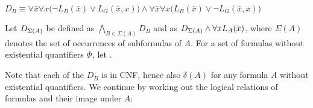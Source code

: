 \begin{defi}
\begin{itemize}
		$D_B\equiv \forall \bar x \forall x \big(\lnot L_B(\bar x) \lor L_G(\bar x, x)\big) \land \forall \bar x \forall x \big(L_B(\bar x) \lor \lnot L_G(\bar x, x)\big)$
\end{itemize}

Let $D_{\Sigma(A)}$ be defined as $\bigwedge_{B \in \Sigma(A)} D_B$ and
 as $D_{\Sigma(A)} \land \forall \bar x L_A(\bar x)$, where $\Sigma(A)$ denotes the set of occurrences of subformulas of $A$.
For a set of formulas without existential quantifiers $\Phi$, let .
\end{defi}

Note that each of the $D_B$ is in CNF, hence also $\delta(A)$ for any formula $A$ without existential quantifiers.
We continue by working out the logical relations of formulas and their image under $A$:

